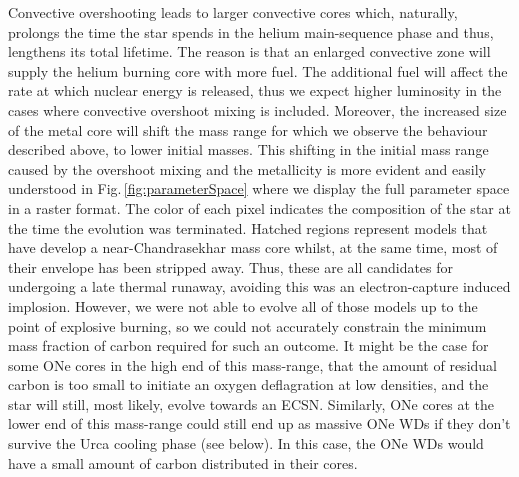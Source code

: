 \documentclass[../../main/thesis_msc.tex]{subfiles}
\begin{document}
    Convective overshooting leads to larger convective cores which, naturally, prolongs the time the star spends in the helium main-sequence phase and thus, lengthens its total lifetime. The reason is that an enlarged convective zone will supply the helium burning core with more fuel. The additional fuel will affect the rate at which nuclear energy is released, thus we expect higher luminosity in the cases where convective overshoot mixing is included. Moreover, the increased size of the metal core will shift the mass range for which we observe the behaviour described above, to lower initial masses. This shifting in the initial mass range caused by the overshoot mixing and the metallicity is more evident and easily understood in Fig.\,\ref{fig:parameterSpace} where we display the full parameter space in a raster format. The color of each pixel indicates the composition of the star at the time the evolution was terminated. Hatched regions represent models that have develop a near-Chandrasekhar mass core whilst, at the same time, most of their envelope has been stripped away. Thus, these are all candidates for undergoing a late thermal runaway, avoiding this was an electron-capture induced implosion. However, we were not able to evolve all of those models up to the point of explosive burning, so we could not accurately constrain the minimum mass fraction of carbon required for such an outcome. It might be the case for some ONe cores in the high end of this mass-range, that the amount of residual carbon is too small to initiate an oxygen deflagration at low densities, and the star will still, most likely, evolve towards an ECSN. Similarly, ONe cores at the lower end of this mass-range could still end up as massive ONe WDs if they don't survive the Urca cooling phase (see below). In this case, the ONe WDs would have a small amount of carbon distributed in their cores.
    
 
    
\end{document}

